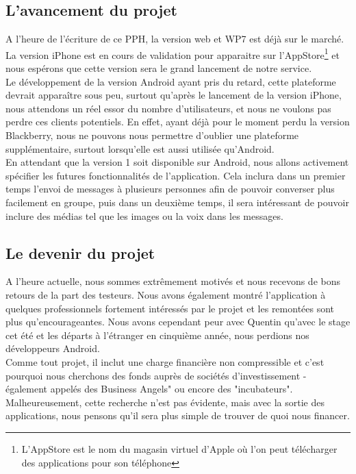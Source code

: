 \documentclass{article}
\begin{document}
	\subsection{L'avancement du projet}
	A l'heure de l'écriture de ce PPH, la version web et WP7 est déjà sur le marché. La version iPhone est en cours de validation pour apparaitre sur l'AppStore\footnote{L'AppStore est le nom du magasin virtuel d'Apple où l'on peut télécharger des applications pour son téléphone} et nous espérons que cette version sera le grand lancement de notre service. \\
	
	Le développement de la version Android ayant pris du retard, cette plateforme devrait apparaître sous peu, surtout qu'après le lancement de la version iPhone, nous attendons un réel essor du nombre d'utilisateurs, et nous ne voulons pas perdre ces clients potentiels. En effet, ayant déjà pour le moment perdu la version Blackberry, nous ne pouvons nous permettre d'oublier une plateforme supplémentaire, surtout lorsqu'elle est aussi utilisée qu'Android. \\
	
	En attendant que la version 1 soit disponible sur Android, nous allons activement spécifier les futures fonctionnalités de l'application. Cela inclura dans un premier temps l'envoi de messages à plusieurs personnes afin de pouvoir converser plus facilement en groupe, puis dans un deuxième temps, il sera intéressant de pouvoir inclure des médias tel que les images ou la voix dans les messages.  
	
	\subsection{Le devenir du projet}
	A l'heure actuelle, nous sommes extrêmement motivés et nous recevons de bons retours de la part des testeurs. Nous avons également montré l'application à quelques professionnels fortement intéressés par le projet et les remontées sont plus qu'encourageantes.  Nous avons cependant peur avec Quentin qu'avec le stage cet été et les départs à l'étranger en cinquième année, nous perdions nos développeurs Android. \\
	
	Comme tout projet, il inclut une charge financière non compressible et c'est pourquoi nous cherchons des fonds auprès de sociétés d'investissement - également appelés des Business Angels" ou encore des "incubateurs". Malheureusement, cette recherche n’est pas évidente, mais avec la sortie des applications, nous pensons qu’il sera plus simple de trouver de quoi nous financer.  
	
\end{document}
